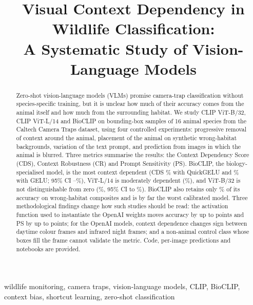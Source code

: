 \documentclass[conference]{IEEEtran}
\begin{document}
\title{Visual Context Dependency in Wildlife Classification:\\
A Systematic Study of Vision-Language Models}

\author{
}

\maketitle

\begin{abstract}
Zero-shot vision-language models (VLMs) promise camera-trap classification without species-specific training, but it is unclear how much of their accuracy comes from the animal itself and how much from the surrounding habitat. We study CLIP ViT-B/32, CLIP ViT-L/14 and BioCLIP on \NSamples{} bounding-box samples of 16 animal species from the Caltech Camera Traps dataset, using four controlled experiments: progressive removal of context around the animal, placement of the animal on synthetic wrong-habitat backgrounds, variation of the text prompt, and prediction from images in which the animal is blurred. Three metrics summarise the results: the Context Dependency Score (CDS), Context Robustness (CR) and Prompt Sensitivity (PS). BioCLIP, the biology-specialised model, is the most context dependent (CDS \QBioCDS\% with QuickGELU and \GBioCDS\% with GELU; 95\% CI \QBioCDSLo--\QBioCDSHi\%), ViT-L/14 is moderately dependent (\QVLCDS\%), and ViT-B/32 is not distinguishable from zero (\QVBCDS\%, 95\% CI \QVBCDSLo{} to \QVBCDSHi\%). BioCLIP also retains only \QBioCR\% of its accuracy on wrong-habitat composites and is by far the worst calibrated model. Three methodological findings change how such studies should be read: the activation function used to instantiate the OpenAI weights moves accuracy by up to \MaxDeltaFull{} points and PS by up to \MaxDeltaPS{} points; for the OpenAI models, context dependence changes sign between daytime colour frames and infrared night frames; and a non-animal control class whose boxes fill the frame cannot validate the metric. Code, per-image predictions and notebooks are provided.
\end{abstract}

\begin{IEEEkeywords}
wildlife monitoring, camera traps, vision-language models, CLIP, BioCLIP, context bias, shortcut learning, zero-shot classification
\end{IEEEkeywords}
\end{document}
